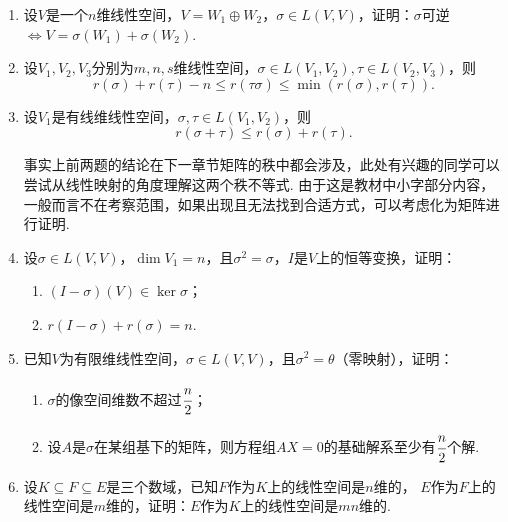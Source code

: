 \begin{enumerate}
    \item 设$V$是一个$n$维线性空间，$V=W_1\oplus W_2$，$\sigma\in L(V,V)$，证明：$\sigma$可逆$\iff V=\sigma(W_1)+\sigma(W_2)$.
	\item 设$V_1,V_2,V_3$分别为$m,n,s$维线性空间，$\sigma\in L(V_1,V_2),\tau\in L(V_2,V_3)$，则
	\[r(\sigma)+r(\tau)-n \le r(\tau\sigma) \le \min(r(\sigma),r(\tau)).\]
	\item 设$V_1$是有线维线性空间，$\sigma,\tau\in L(V_1,V_2)$，则
	\[r(\sigma+\tau) \le r(\sigma)+r(\tau).\]
	
	事实上前两题的结论在下一章节矩阵的秩中都会涉及，此处有兴趣的同学可以尝试从线性映射的角度理解这两个秩不等式.
	由于这是教材中小字部分内容，一般而言不在考察范围，如果出现且无法找到合适方式，可以考虑化为矩阵进行证明.
	\item 设$\sigma\in L(V,V)$，$\dim V_1=n$，且$\sigma^2=\sigma$，$I$是$V$上的恒等变换，证明：
	\begin{enumerate}
        \item $(I-\sigma)(V) \in \ker\sigma$；
        \item $r(I-\sigma)+r(\sigma)=n$.
    \end{enumerate}
	\item 已知$V$为有限维线性空间，$\sigma\in L(V,V)$，且$\sigma^2=\theta$（零映射），证明：
	\begin{enumerate}
        \item $\sigma$的像空间维数不超过$\cfrac{n}{2}$；
        \item 设$A$是$\sigma$在某组基下的矩阵，则方程组$AX=0$的基础解系至少有$\cfrac{n}{2}$个解.
    \end{enumerate}
    \item 设$K \subseteq F \subseteq E$是三个数域，已知$F$作为$K$上的线性空间是$n$维的，
	$E$作为$F$上的线性空间是$m$维的，证明：$E$作为$K$上的线性空间是$mn$维的.
\end{enumerate}
